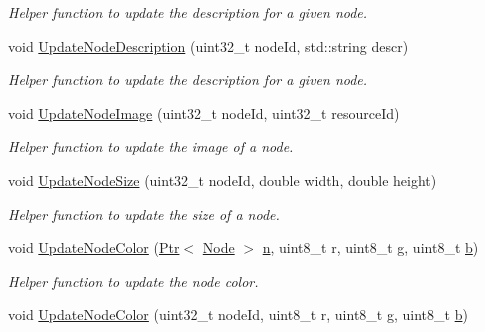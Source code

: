 \begin{DoxyCompactItemize}
\begin{DoxyCompactList}\small\item\em Helper function to update the description for a given node. \end{DoxyCompactList}\item 
void \hyperlink{classns3_1_1AnimationInterface_a093c37cd9802c236d441bcefba436a71}{Update\+Node\+Description} (uint32\+\_\+t node\+Id, std\+::string descr)
\begin{DoxyCompactList}\small\item\em Helper function to update the description for a given node. \end{DoxyCompactList}\item 
void \hyperlink{classns3_1_1AnimationInterface_a52d452668baff3587273d6137f1a2f47}{Update\+Node\+Image} (uint32\+\_\+t node\+Id, uint32\+\_\+t resource\+Id)
\begin{DoxyCompactList}\small\item\em Helper function to update the image of a node. \end{DoxyCompactList}\item 
void \hyperlink{classns3_1_1AnimationInterface_a95060ce2565165f5f25a00340bb9a0c1}{Update\+Node\+Size} (uint32\+\_\+t node\+Id, double width, double height)
\begin{DoxyCompactList}\small\item\em Helper function to update the size of a node. \end{DoxyCompactList}\item 
void \hyperlink{classns3_1_1AnimationInterface_adba07ccf6613113799782712287720cb}{Update\+Node\+Color} (\hyperlink{classns3_1_1Ptr}{Ptr}$<$ \hyperlink{classns3_1_1Node}{Node} $>$ \hyperlink{lte__link__budget__x2__handover__measures_8m_abdb05bc5a064cf642a06c83b3392f148}{n}, uint8\+\_\+t r, uint8\+\_\+t \hyperlink{loss__OH__suburban_8m_a6182af7c15da7a804d8d96b71bcd5ab7}{g}, uint8\+\_\+t \hyperlink{lte__pathloss_8m_a21ad0bd836b90d08f4cf640b4c298e7c}{b})
\begin{DoxyCompactList}\small\item\em Helper function to update the node color. \end{DoxyCompactList}\item 
void \hyperlink{classns3_1_1AnimationInterface_a75ea0f6144a851e84dc698456ffbc945}{Update\+Node\+Color} (uint32\+\_\+t node\+Id, uint8\+\_\+t r, uint8\+\_\+t \hyperlink{loss__OH__suburban_8m_a6182af7c15da7a804d8d96b71bcd5ab7}{g}, uint8\+\_\+t \hyperlink{lte__pathloss_8m_a21ad0bd836b90d08f4cf640b4c298e7c}{b})

\end{DoxyCompactItemize}
